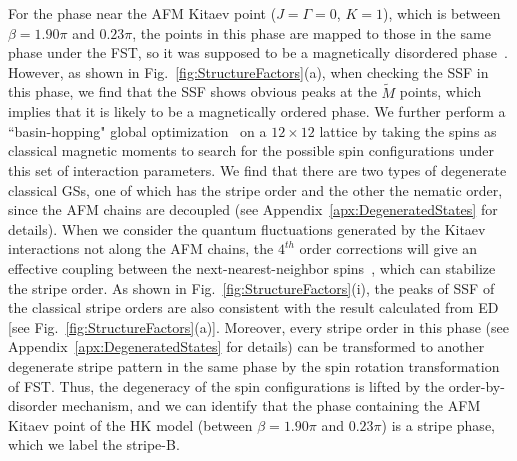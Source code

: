 \documentclass[aps,prb,reprint,amsfonts,amsmath,amssymb,showpacs,groupedaddress,superscriptaddress]{revtex4-1}
\begin{document}
For the phase near the AFM Kitaev point ($J=\Gamma=0$, $K=1$), which is between $\beta=1.90\pi$ and $0.23\pi$, the points in this phase are mapped to those in the same phase under the FST, so it was supposed to be a magnetically disordered phase~\cite{KaiLi2015}. However, as shown in Fig.~\ref{fig:StructureFactors}(a), when checking the SSF in this phase, we find that the SSF shows obvious peaks at the $\tilde{M}$ points, which implies that it is likely to be a magnetically ordered phase. We further perform a ``basin-hopping" global optimization~\cite{jp970984n} on a $12 \times 12$ lattice by taking the spins as classical magnetic moments to search for the possible spin configurations under this set of interaction parameters. We find that there are two types of degenerate classical GSs, one of which has the stripe order and the other the nematic order, since the AFM chains are decoupled (see Appendix~\ref{apx:DegeneratedStates} for details). When we consider the quantum fluctuations generated by the Kitaev interactions not along the AFM chains, the $4^{th}$ order corrections will give an effective coupling between the next-nearest-neighbor spins~\cite{PhysRevB.92.184416}, which can stabilize the stripe order. As shown in Fig.~\ref{fig:StructureFactors}(i), the peaks of SSF of the classical stripe orders are also consistent with the result calculated from ED [see Fig.~\ref{fig:StructureFactors}(a)]. Moreover, every stripe order in this phase (see Appendix~\ref{apx:DegeneratedStates} for details) can be transformed to another degenerate stripe pattern in the same phase by the spin rotation transformation of FST. Thus, the degeneracy of the spin configurations is lifted by the order-by-disorder mechanism, and we can identify that the phase containing the AFM Kitaev point of the HK model (between $\beta=1.90\pi$ and $0.23\pi$) is a stripe phase, which we label the stripe-B.
\end{document}

